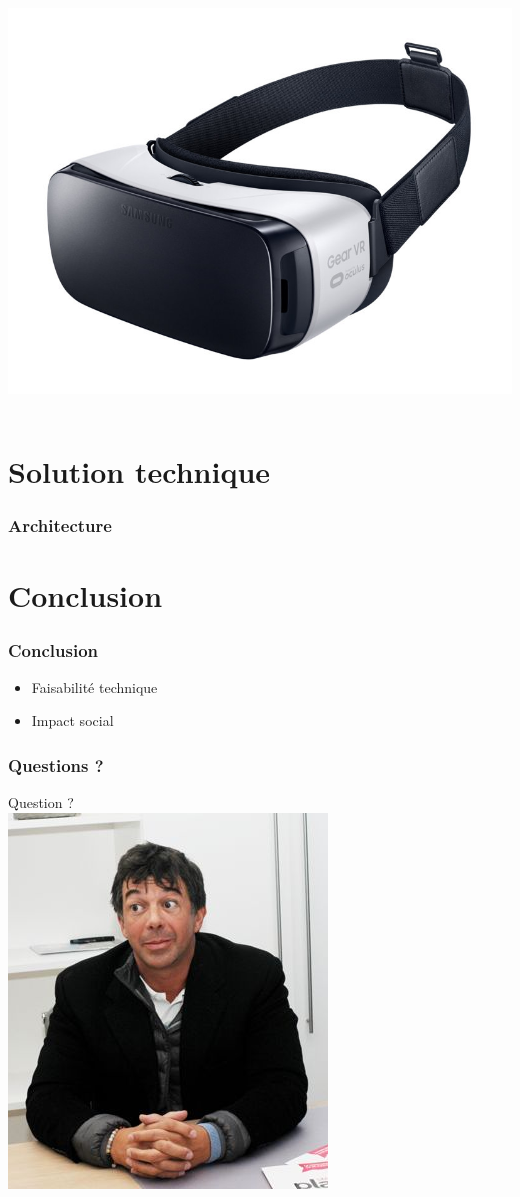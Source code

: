 \documentclass{beamer}
\begin{document}
\begin{frame}
\begin{columns}
    \includegraphics[scale=0.2]{../images/VR.jpeg}
  \end{columns}
\end{frame}

\section{Solution technique}
\begin{frame}
  \frametitle{Architecture}
\end{frame}

\section{Conclusion}
\begin{frame}
  \frametitle{Conclusion}
  \begin{itemize}
  \item Faisabilité technique
  \item Impact social
  \end{itemize}
\end{frame}

\begin{frame}
  \frametitle{Questions ?}
  \begin{center}
    Question ? \\
    \includegraphics[scale=1.2]{../images/agent_immobilier.png}
  \end{center}
\end{frame}
\end{document}
